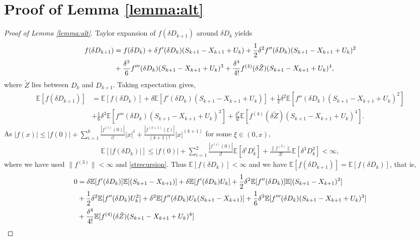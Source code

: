 \documentclass[11pt,letterpaper,reqno]{article}
\theoremstyle{thmstyleone}%
\theoremstyle{thmstyletwo}%
\theoremstyle{thmstylethree}%
\numberwithin{equation}{section}
\begin{document}
 \section{Proof of Lemma \ref{lemma:alt}}\label{app:lindley}
\begin{proof}[Proof of Lemma \ref{lemma:alt}]
Taylor expansion of $f(\delta D_{k+1})$ around $\delta D_k$ yields
\begin{align*}
    f(\delta D_{k+1})&=f(\delta D_k)+\delta f'(\delta D_k)(S_{k+1}-X_{k+1}+U_k)+\frac{1}{2}\delta^2f''(\delta D_k)(S_{k+1}-X_{k+1}+U_k)^2\\
    &+\frac{\delta^3}{6}f'''(\delta D_k)(S_{k+1}-X_{k+1}+U_k)^3+\frac{\delta^4}{4!}f^{(4)}(\delta \Tilde{Z})(S_{k+1}-X_{k+1}+U_k)^4,
\end{align*}
where $\tilde Z$ lies between $D_k$ and $D_{k+1}$. Taking expectation gives,
\begin{align*}
   \mathbb E [f(\delta D_{k+1})]&=\mathbb E[f(\delta D_k)]+\delta \mathbb E[f'(\delta D_k)(S_{k+1}-X_{k+1}+U_k)]+\frac{1}{2}\delta^2\mathbb E[f''(\delta D_k)(S_{k+1}-X_{k+1}+U_k)^2]\\
    &+\frac{1}{6}\delta^3\mathbb E[f'''(\delta D_k)(S_{k+1}-X_{k+1}+U_k)^3]+\frac{\delta^4}{4!}\mathbb E[f^{(4)}(\delta \tilde{Z})(S_{k+1}-X_{k+1}+U_k)^4].
\end{align*}
As $|f(x)| \leq |f(0)|+ \sum_{i=1}^k \frac{|f^{(i)}(0)|}{i!}|x|^i+\frac{|f^{(k+1)}(\xi)|}{(k+1)!}|x|^{(k+1)}$ for some $\xi \in (0,x)$,
\begin{align*}
      \mathbb E[|f(\delta D_k)|]\leq  |f(0)|+\sum_{i=1}^2\frac{|f^{(i)}(0)|}{i!}\mathbb E[\delta^iD_k^i]+\frac{\|f^{(3)}\|}{3!}\mathbb E[\delta^{3}D_k^{3}]< \infty,
\end{align*}
where we have used $\|f^{(3)}\|< \infty $ and \eqref{strecursion}. Thus $  \mathbb E[f(\delta D_k)]< \infty$ and we have $ \mathbb E [f(\delta D_{k+1})]=\mathbb E[f(\delta D_k)]$, that is,
\begin{align}
 \nonumber   0&=\delta \mathbb E[f'(\delta D_k)]\mathbb E[(S_{k+1}-X_{k+1})]+\delta \mathbb E[f'(\delta D_k)U_k]+\frac{1}{2}\delta^2 \mathbb E[f''(\delta D_k)] \mathbb E[(S_{k+1}-X_{k+1})^2] \nonumber\\
 &+\frac{1}{2}\delta^2 \mathbb E[f''(\delta D_k)U_k^2]+\delta^2 \mathbb E[f''(\delta D_k)U_k(S_{k+1}-X_{k+1})]+\frac{1}{6}\delta^3\mathbb E[f'''(\delta D_k)(S_{k+1}-X_{k+1}+U_k)^3] \nonumber\\
&\nonumber +\frac{\delta^4}{4!}\mathbb E[f^{(4)}(\delta \Tilde{Z})(S_{k+1}-X_{k+1}+U_k)^4] \\

\end{align}
\end{proof}
\end{document}
